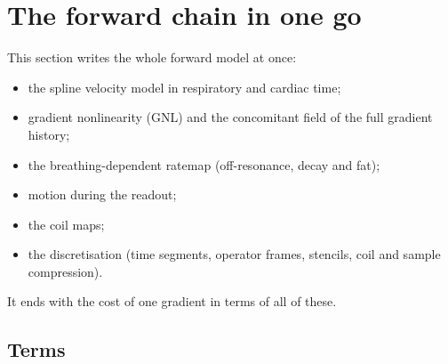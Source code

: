 \documentclass[11pt]{article}
\theoremstyle{remark}
\begin{document}
\section{The forward chain in one go}
\label{sec:chain}

This section writes the whole forward model at once:
\begin{itemize}
  \item the spline velocity model in respiratory and cardiac time;
  \item gradient nonlinearity (GNL) and the concomitant field of the full gradient history;
  \item the breathing-dependent ratemap (off-resonance, decay and fat);
  \item motion during the readout;
  \item the coil maps;
  \item the discretisation (time segments, operator frames, stencils, coil and sample compression).
\end{itemize}
It ends with the cost of one gradient in terms of all of these.

\subsection{Terms}
\label{sec:terms}
\end{document}
